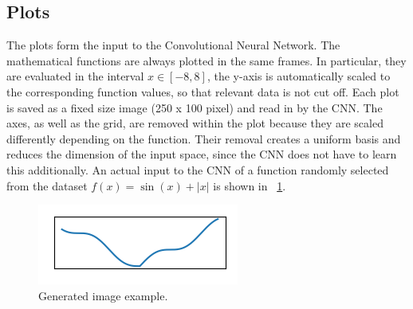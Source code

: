 \subsection{Plots}

The plots form the input to the Convolutional Neural Network. The mathematical functions are always plotted in the same frames. In particular, they are evaluated in the interval $x \in [-8,8]$, the y-axis is automatically scaled to the corresponding function values, so that relevant data is not cut off. Each plot is saved as a fixed size image (250 x 100 pixel) and read in by the CNN. The axes, as well as the grid, are removed within the plot because they are scaled differently depending on the function. Their removal creates a uniform basis and reduces the dimension of the input space, since the CNN does not have to learn this additionally. An actual input to the CNN of a function randomly selected from the dataset $f(x) = \sin(x)+|x|$ is shown in \Fig~\ref{fig:function_example}.
\begin{figure}[h!]
	\centering
	\includegraphics[width=0.4\linewidth]{./ImageFiles/Data Generation/function_example}
	\caption{Generated image example.}
	\label{fig:function_example}
\end{figure}
